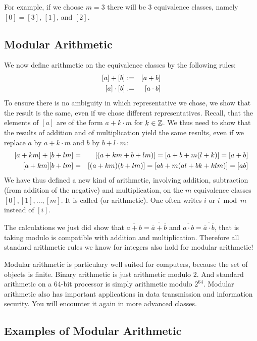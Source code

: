For example, if we choose $m=3$ there will be $3$ equivalence classes,
namely $[0]=[3]$, $[1]$, and $[2]$.

\subsection{Modular Arithmetic}

We now define arithmetic on the equivalence classes by the following rules:
\begin{eqnarray*}
\hbox{$[a]+[b]$}&:=&[a+b]\\
\hbox{$[a]\cdot[b]$}&:=&[a\cdot b]\\
\end{eqnarray*}
To ensure there is no ambiguity in which representative we chose, we show that the
result is the same, even if we chose different representatives. Recall, that the
elements of $[a]$ are of the form $a+k\cdot m$ for $k\in{\mathbb Z}$. We thus need to show that
the results of addition and of multiplication yield the same results, even if we replace
$a$ by $a+k\cdot m$ and $b$ by $b+l\cdot m$:
\begin{eqnarray*}
\hbox{$[a+km]+[b+lm]$}&=&[(a+km+b+lm)]=[a+b+m(l+k)]=[a+b]\\
\hbox{$[a+km][b+lm]$}&=&[(a+km)(b+lm)]=[ab+m(al+bk+klm)]=[ab]
\end{eqnarray*}
We have thus defined a new kind of arithmetic, involving addition, subtraction (from
addition of the negative) and multiplication, on the $m$ equivalence classes
$[0],[1],\ldots,[m]$. It is called  (or 
arithmetic). One often writes
$\overline{i}$ or $i\bmod m$ instead of $[i]$.

The calculations we just did show that
$\overline{a+b}=\overline{\overline{a}+\overline{b}}$ and
$\overline{a\cdot b}=\overline{\overline{a}\cdot \overline{b}}$, that is taking modulo
is compatible with addition and multiplication. Therefore all standard arithmetic rules
we know for integers also hold for modular arithmetic!
\medskip

Modular arithmetic is particulary well suited for computers, because the set of objects
is finite. Binary arithmetic is just arithmetic modulo $2$. And standard arithmetic on a
64-bit processor is simply arithmetic modulo $2^{64}$.
Modular arithmetic also has important applications in data transmission and information
security. You will encounter it again in more advanced classes.

\subsection{Examples of Modular Arithmetic}


